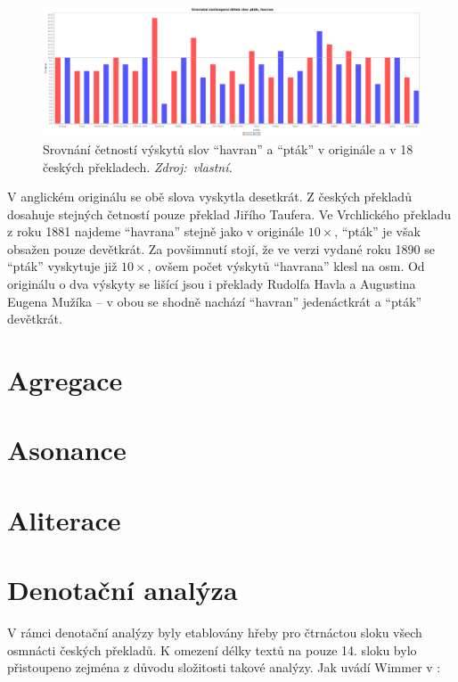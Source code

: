 \documentclass[dp.tex]{subfiles}
\begin{document}
\begin{figure}[h!]
	\centering
	\includegraphics[max width=\textwidth,keepaspectratio=true]{imgs-70-prakticka/cetnost-slov-orig}
	\caption[Srovnání četností výskytů slov \enquote{havran} a \enquote{pták} v originále a v 18 českých překladech.]{Srovnání četností výskytů slov \enquote{havran} a \enquote{pták} v originále a v 18 českých překladech. \textit{Zdroj:~vlastní.}}
	\label{fig:word-freq-compare}
\end{figure}

V anglickém originálu se obě slova vyskytla desetkrát. Z českých překladů dosahuje stejných četností pouze překlad Jiřího Taufera. Ve Vrchlického překladu z roku 1881 najdeme \enquote{havrana} stejně jako v originále $10\times$, \enquote{pták} je však obsažen pouze devětkrát. Za povšimnutí stojí, že ve verzi vydané roku 1890 se \enquote{pták} vyskytuje již $10\times$, ovšem počet výskytů \enquote{havrana} klesl na osm. Od originálu o dva výskyty se lišící jsou i překlady Rudolfa Havla a Augustina Eugena Mužíka -- v obou se shodně nachází \enquote{havran} jedenáctkrát a \enquote{pták} devětkrát.

\section{Agregace}
\section{Asonance}
\section{Aliterace}
\section{Denotační analýza}
\label{chap:denotation-analysis} 

V rámci denotační analýzy byly etablovány hřeby pro čtrnáctou sloku všech osmnácti českých překladů. K omezení délky textů na pouze 14. sloku bylo přistoupeno zejména z důvodu složitosti takové analýzy. Jak uvádí Wimmer v \cite[str.~300]{Wimmer2003}: 
\end{document}
